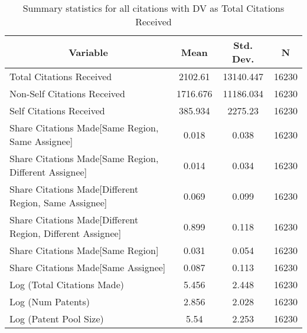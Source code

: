 
\begin{table}[htbp]\centering \caption{Summary statistics for all citations with DV as Total Citations Received \label{a.e.o.t.n.tsummary}}
\begin{tabular}{l c c  c}\hline\hline
\multicolumn{1}{c}{\textbf{Variable}} & \textbf{Mean}
 & \textbf{Std. Dev.} & \textbf{N}\\ \hline
Total Citations Received & 2102.61 & 13140.447  & 16230\\
Non-Self Citations Received & 1716.676 & 11186.034  & 16230\\
Self Citations Received & 385.934 & 2275.23  & 16230\\
Share Citations Made[Same Region, Same Assignee] & 0.018 & 0.038  & 16230\\
Share Citations Made[Same Region, Different Assignee] & 0.014 & 0.034  & 16230\\
Share Citations Made[Different Region, Same Assignee] & 0.069 & 0.099  & 16230\\
Share Citations Made[Different Region, Different Assignee] & 0.899 & 0.118  & 16230\\
Share Citations Made[Same Region] & 0.031 & 0.054  & 16230\\
Share Citations Made[Same Assignee] & 0.087 & 0.113  & 16230\\
Log (Total Citations Made) & 5.456 & 2.448  & 16230\\
Log (Num Patents) & 2.856 & 2.028  & 16230\\
Log (Patent Pool Size) & 5.54 & 2.253  & 16230\\
\hline\end{tabular}
\end{table}
